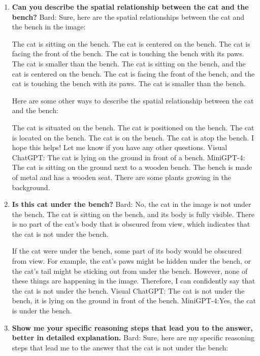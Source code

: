     \begin{enumerate}
        \item \textbf{Can you describe the spatial relationship between the cat and the bench?}
        \subitem Bard:
        Sure, here are the spatial relationships between the cat and the bench in the image:

        The cat is sitting on the bench.
        The cat is centered on the bench.
        The cat is facing the front of the bench.
        The cat is touching the bench with its paws.
        The cat is smaller than the bench.
        The cat is sitting on the bench, and the cat is centered on the bench. The cat is facing the front of the bench, and the cat is touching the bench with its paws. The cat is smaller than the bench.

        Here are some other ways to describe the spatial relationship between the cat and the bench:

        The cat is situated on the bench.
        The cat is positioned on the bench.
        The cat is located on the bench.
        The cat is on the bench.
        The cat is atop the bench.
        I hope this helps! Let me know if you have any other questions.
        \subitem Visual ChatGPT: The cat is lying on the ground in front of a bench.
        \subitem MiniGPT-4: The cat is sitting on the ground next to a wooden bench. The bench is made of metal and has a wooden seat. There are some plants growing in the background.
        \item \textbf{Is this cat under the bench?}
        \subitem Bard: No, the cat in the image is not under the bench. The cat is sitting on the bench, and its body is fully visible. There is no part of the cat's body that is obscured from view, which indicates that the cat is not under the bench.

        If the cat were under the bench, some part of its body would be obscured from view. For example, the cat's paws might be hidden under the bench, or the cat's tail might be sticking out from under the bench. However, none of these things are happening in the image. Therefore, I can confidently say that the cat is not under the bench.
        \subitem Visual ChatGPT: The cat is not under the bench, it is lying on the ground in front of the bench.
        \subitem MiniGPT-4:Yes, the cat is under the bench.
        \item \textbf{Show me your specific reasoning steps that lead you to the answer, better in detailed explanation.}
        \subitem Bard: 
        Sure, here are my specific reasoning steps that lead me to the answer that the cat is not under the bench:
        

\end{enumerate}
